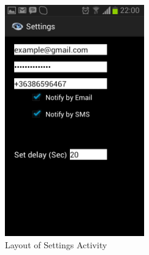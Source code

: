 \begin{figure}[ht!]
\centering
\includegraphics[width=60mm]{settings.png}
\caption{Layout of Settings Activity}
\label{overflow}
\end{figure}    
 